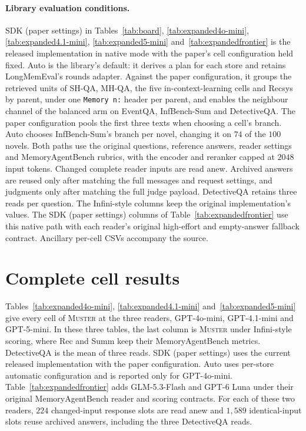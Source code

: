 \documentclass{article}
\newcommand{\sys}{\textsc{Muster}}
\begin{document}
\paragraph{Library evaluation conditions.} SDK (paper settings) in Tables~\ref{tab:board}, \ref{tab:expanded4o-mini}, \ref{tab:expanded4.1-mini}, \ref{tab:expanded5-mini} and~\ref{tab:expandedfrontier} is the released implementation in native mode with the paper's cell configuration held fixed. Auto is the library's default: it derives a plan for each store and retains LongMemEval's rounds adapter. Against the paper configuration, it groups the retrieved units of SH-QA, MH-QA, the five in-context-learning cells and Recsys by parent, under one \texttt{Memory n:} header per parent, and enables the neighbour channel of the balanced arm on EventQA, InfBench-Sum and DetectiveQA. The paper configuration pools the first three texts when choosing a cell's branch. Auto chooses InfBench-Sum's branch per novel, changing it on $74$ of the $100$ novels. Both paths use the original questions, reference answers, reader settings and MemoryAgentBench rubrics, with the encoder and reranker capped at $2048$ input tokens. Changed complete reader inputs are read anew. Archived answers are reused only after matching the full messages and request settings, and judgments only after matching the full judge payload. DetectiveQA retains three reads per question. The Infini-style columns keep the original implementation's values. The SDK (paper settings) columns of Table~\ref{tab:expandedfrontier} use this native path with each reader's original high-effort and empty-answer fallback contract. Ancillary per-cell CSVs accompany the source.

\section{Complete cell results}\label{app:expanded}

Tables~\ref{tab:expanded4o-mini}, \ref{tab:expanded4.1-mini} and~\ref{tab:expanded5-mini} give every cell of \sys{} at the three readers, GPT-4o-mini, GPT-4.1-mini and GPT-5-mini. In these three tables, the last column is \sys{} under Infini-style scoring, where Rec and Summ keep their MemoryAgentBench metrics. DetectiveQA is the mean of three reads. SDK (paper settings) uses the current released implementation with the paper configuration. Auto uses per-store automatic configuration and is reported only for GPT-4o-mini. Table~\ref{tab:expandedfrontier} adds GLM-5.3-Flash and GPT-6 Luna under their original MemoryAgentBench reader and scoring contracts. For each of these two readers, $224$ changed-input response slots are read anew and $1{,}589$ identical-input slots reuse archived answers, including the three DetectiveQA reads.
\end{document}
